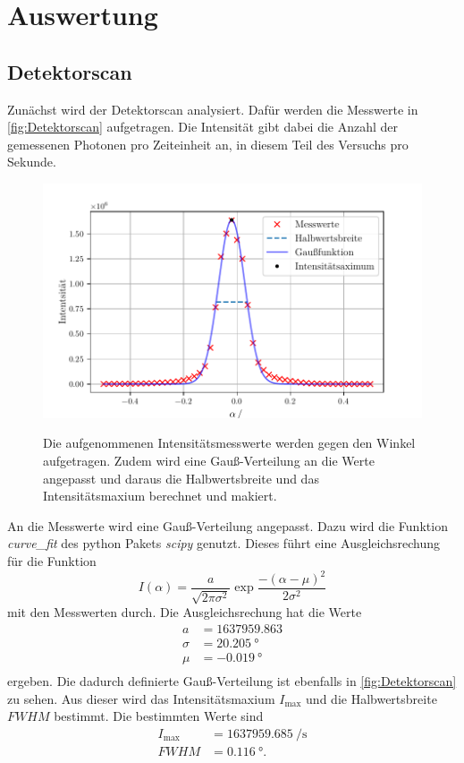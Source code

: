 \section{Auswertung}
\label{sec:Auswertung}

\subsection{Detektorscan}
Zunächst wird der Detektorscan analysiert. 
Dafür werden die Messwerte in \autoref{fig:Detektorscan} aufgetragen.
Die Intensität gibt dabei die Anzahl der gemessenen Photonen pro Zeiteinheit an, in diesem Teil des Versuchs pro Sekunde.
\begin{figure}
    \centering
    \caption{Die aufgenommenen Intensitätsmesswerte werden gegen den Winkel aufgetragen. Zudem wird eine Gauß-Verteilung an die Werte angepasst und daraus die Halbwertsbreite und das Intensitätsmaxium berechnet und makiert.}
    \includegraphics[width=\textwidth]{content/data/Detectorscan.pdf}
    \label{fig:Detektorscan}
\end{figure}
An die Messwerte wird eine Gauß-Verteilung angepasst.
Dazu wird die Funktion \textit{curve\_fit} des python Pakets \textit{scipy} \cite{scipy} genutzt.
Dieses führt eine Ausgleichsrechung für die Funktion 
\begin{equation*}
    I(\alpha) = \frac{a}{\sqrt{2\pi\sigma^2}} \exp{\frac{-\left (\alpha- \mu \right)^2}{2\sigma^2}}
\end{equation*}
mit den Messwerten durch.
Die Ausgleichsrechung hat die Werte 
\begin{align*}
    a &= 1637959.863\\
    \sigma &= \SI{20.205}{\degree} \\
    \mu &= \SI{-0.019}{\degree} \\
\end{align*}
ergeben.
Die dadurch definierte Gauß-Verteilung ist ebenfalls in \autoref{fig:Detektorscan} zu sehen.
Aus dieser wird das Intensitätsmaxium $I_\text{max}$ und die Halbwertsbreite $FWHM$ bestimmt.
Die bestimmten Werte sind
\begin{align*}
    I_\text{max} &= \SI{1637959.685}{\per \second} \\
    FWHM &= \SI{0.116}{\degree}.\\
\end{align*}
\FloatBarrier
